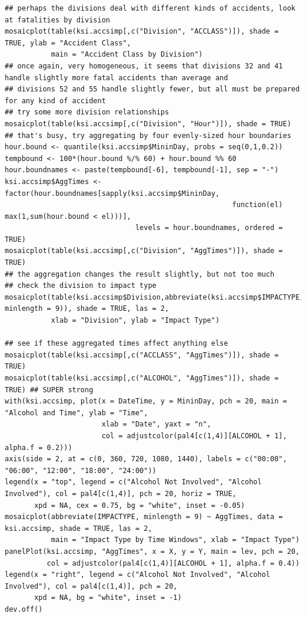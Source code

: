 \documentclass{article}
\begin{document}
\begin{lstlisting}
## perhaps the divisions deal with different kinds of accidents, look at fatalities by division
mosaicplot(table(ksi.accsimp[,c("Division", "ACCLASS")]), shade = TRUE, ylab = "Accident Class",
           main = "Accident Class by Division")
## once again, very homogeneous, it seems that divisions 32 and 41 handle slightly more fatal accidents than average and
## divisions 52 and 55 handle slightly fewer, but all must be prepared for any kind of accident
## try some more division relationships
mosaicplot(table(ksi.accsimp[,c("Division", "Hour")]), shade = TRUE)
## that's busy, try aggregating by four evenly-sized hour boundaries
hour.bound <- quantile(ksi.accsimp$MininDay, probs = seq(0,1,0.2))
tempbound <- 100*(hour.bound %/% 60) + hour.bound %% 60
hour.boundnames <- paste(tempbound[-6], tempbound[-1], sep = "-")
ksi.accsimp$AggTimes <- factor(hour.boundnames[sapply(ksi.accsimp$MininDay,
                                                      function(el) max(1,sum(hour.bound < el)))],
                               levels = hour.boundnames, ordered = TRUE)
mosaicplot(table(ksi.accsimp[,c("Division", "AggTimes")]), shade = TRUE)
## the aggregation changes the result slightly, but not too much
## check the division to impact type
mosaicplot(table(ksi.accsimp$Division,abbreviate(ksi.accsimp$IMPACTYPE, minlength = 9)), shade = TRUE, las = 2,
           xlab = "Division", ylab = "Impact Type")

## see if these aggregated times affect anything else
mosaicplot(table(ksi.accsimp[,c("ACCLASS", "AggTimes")]), shade = TRUE)
mosaicplot(table(ksi.accsimp[,c("ALCOHOL", "AggTimes")]), shade = TRUE) ## SUPER strong
with(ksi.accsimp, plot(x = DateTime, y = MininDay, pch = 20, main = "Alcohol and Time", ylab = "Time",
                       xlab = "Date", yaxt = "n",
                       col = adjustcolor(pal4[c(1,4)][ALCOHOL + 1], alpha.f = 0.2)))
axis(side = 2, at = c(0, 360, 720, 1080, 1440), labels = c("00:00", "06:00", "12:00", "18:00", "24:00"))
legend(x = "top", legend = c("Alcohol Not Involved", "Alcohol Involved"), col = pal4[c(1,4)], pch = 20, horiz = TRUE,
       xpd = NA, cex = 0.75, bg = "white", inset = -0.05)
mosaicplot(abbreviate(IMPACTYPE, minlength = 9) ~ AggTimes, data = ksi.accsimp, shade = TRUE, las = 2,
           main = "Impact Type by Time Windows", xlab = "Impact Type")
panelPlot(ksi.accsimp, "AggTimes", x = X, y = Y, main = lev, pch = 20,
          col = adjustcolor(pal4[c(1,4)][ALCOHOL + 1], alpha.f = 0.4))
legend(x = "right", legend = c("Alcohol Not Involved", "Alcohol Involved"), col = pal4[c(1,4)], pch = 20,
       xpd = NA, bg = "white", inset = -1)
dev.off()


\end{lstlisting}
\end{document}
